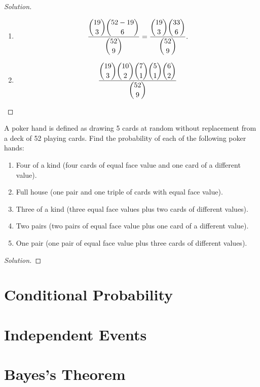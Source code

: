 \documentclass[class=probandstats,crop=false]{standalone}
\begin{document}
\begin{proof}[Solution]
    \begin{enumerate}[label = \textbf{(\alph*)}]
        \item
              \[
                  \dfrac{
                      \dbinom{19}{3}\dbinom{52-19}{6}
                  }{\dbinom{52}{9}}
                  =
                  \dfrac{
                      \dbinom{19}{3}\dbinom{33}{6}
                  }{\dbinom{52}{9}}.
              \]
        \item
              \[
                  \dfrac{
                      \dbinom{19}{3}
                      \dbinom{10}{2}
                      \dbinom{7}{1}
                      \dbinom{5}{1}
                      \dbinom{6}{2}
                  }{\dbinom{52}{9}}
              \]
    \end{enumerate}
\end{proof}

\begin{exercise}
    \par A poker hand is defined as drawing 5 cards at random without replacement from a deck of 52 playing cards. Find the probability of each of the following poker hands:
    \begin{enumerate}[label = \textbf{(\alph*)}]
        \item Four of a kind (four cards of equal face value and one card of a different value).
        \item Full house (one pair and one triple of cards with equal face value).
        \item Three of a kind (three equal face values plus two cards of different values).
        \item Two pairs (two pairs of equal face value plus one card of a different value).
        \item One pair (one pair of equal face value plus three cards of different values).
    \end{enumerate}
\end{exercise}

\begin{proof}[Solution]
    \par \idontknowcards
\end{proof}

\section{Conditional Probability}



\section{Independent Events}



\section{Bayes's Theorem}
\end{document}
